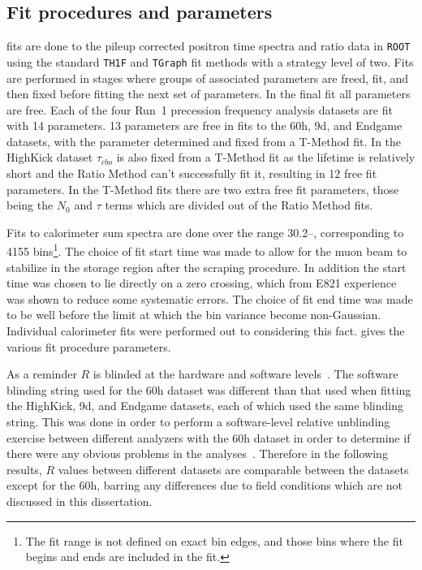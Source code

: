 \subsection{Fit procedures and parameters}


\chisq fits are done to the pileup corrected positron time spectra and ratio data in \texttt{ROOT} using the standard \texttt{TH1F} and \texttt{TGraph} fit methods with a strategy level of two. Fits are performed in stages where groups of associated parameters are freed, fit, and then fixed before fitting the next set of parameters. In the final fit all parameters are free. Each of the four Run~1 precession frequency analysis datasets are fit with 14 parameters. 13 parameters are free in fits to the 60h, 9d, and Endgame datasets, with the \K parameter determined and fixed from a T-Method fit. In the HighKick dataset $\tau_{cbo}$ is also fixed from a T-Method fit as the lifetime is relatively short and the Ratio Method can't successfully fit it, resulting in 12 free fit parameters. In the T-Method fits there are two extra free fit parameters, those being the $N_{0}$ and $\tau$ terms which are divided out of the Ratio Method fits.

Fits to calorimeter sum spectra are done over the range 30.2--, corresponding to 4155 bins\footnote{The fit range is not defined on exact bin edges, and those bins where the fit begins and ends are included in the fit.}. The choice of fit start time was made to allow for the muon beam to stabilize in the storage region after the scraping procedure. In addition the start time was chosen to lie directly on a \gmtwo zero crossing, which from E821 experience was shown to reduce some systematic errors. The choice of fit end time was made to be well before the limit at which the bin variance become non-Gaussian. Individual calorimeter fits were performed out to  considering this fact.  gives the various fit procedure parameters.


As a reminder $R$ is blinded at the hardware and software levels~\cite{ClockManual,SoftwareBlinding}. The software blinding string used for the 60h dataset was different than that used when fitting the HighKick, 9d, and Endgame datasets, each of which used the same blinding string. This was done in order to perform a software-level relative unblinding exercise between different analyzers with the 60h dataset in order to determine if there were any obvious problems in the analyses~\cite{BU60hReport,60hUnblinding}. Therefore in the following results, $R$ values between different datasets are comparable between the datasets except for the 60h, barring any differences due to field conditions which are not discussed in this dissertation.


